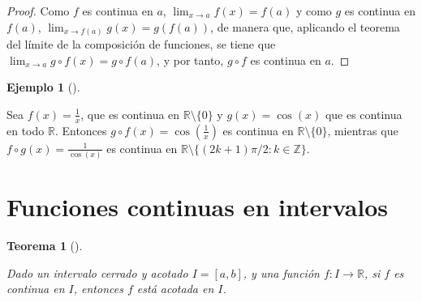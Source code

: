\documentclass[
  a4paper,
]{scrreport}
\theoremstyle{plain}
\theoremstyle{plain}
\newtheorem{theorem}{Teorema}[chapter]
\theoremstyle{definition}
\theoremstyle{plain}
\theoremstyle{definition}
\newtheorem{example}{Ejemplo}[chapter]
\theoremstyle{remark}
\begin{document}
\begin{tcolorbox}[enhanced jigsaw, title=\textcolor{quarto-callout-note-color}{\faInfo}\hspace{0.5em}{Demostración}, opacityback=0, titlerule=0mm, colback=white, opacitybacktitle=0.6, colbacktitle=quarto-callout-note-color!10!white, breakable, left=2mm, bottomtitle=1mm, toptitle=1mm, coltitle=black, arc=.35mm, leftrule=.75mm, toprule=.15mm, rightrule=.15mm, bottomrule=.15mm, colframe=quarto-callout-note-color-frame]

\begin{proof}

Como \(f\) es continua en \(a\), \(\lim_{x\to a}f(x)=f(a)\) y como \(g\)
es continua en \(f(a)\), \(\lim_{x\to f(a)}g(x)=g(f(a))\), de manera
que, aplicando el teorema del límite de la composición de funciones, se
tiene que \(\lim_{x\to a}g\circ f(x)= g\circ f(a)\), y por tanto,
\(g\circ f\) es continua en \(a\).

\end{proof}

\end{tcolorbox}

\leavevmode{}%
\begin{example}[]\label{exm-continuidad-composicion-funciones}

Sea \(f(x)=\frac{1}{x}\), que es continua en
\(\mathbb{R}\setminus\{0\}\) y \(g(x)=\cos(x)\) que es continua en todo
\(\mathbb{R}\). Entonces \(g\circ f(x)=\cos\left(\frac{1}{x}\right)\) es
continua en \(\mathbb{R}\setminus\{0\}\), mientras que
\(f\circ g(x)=\frac{1}{\cos(x)}\) es continua en
\(\mathbb{R}\setminus\{(2k+1)\pi/2: k\in\mathbb{Z}\}\).

\end{example}

\hypertarget{funciones-continuas-en-intervalos}{%
\section{Funciones continuas en
intervalos}\label{funciones-continuas-en-intervalos}}

\leavevmode{}%
\begin{theorem}[]\label{thm-funcion-continua-intervalo-cerrado}

Dado un intervalo cerrado y acotado \(I=[a,b]\), y una función
\(f:I\to\mathbb{R}\), si \(f\) es continua en \(I\), entonces \(f\) está
acotada en \(I\).

\end{theorem}
\end{document}
